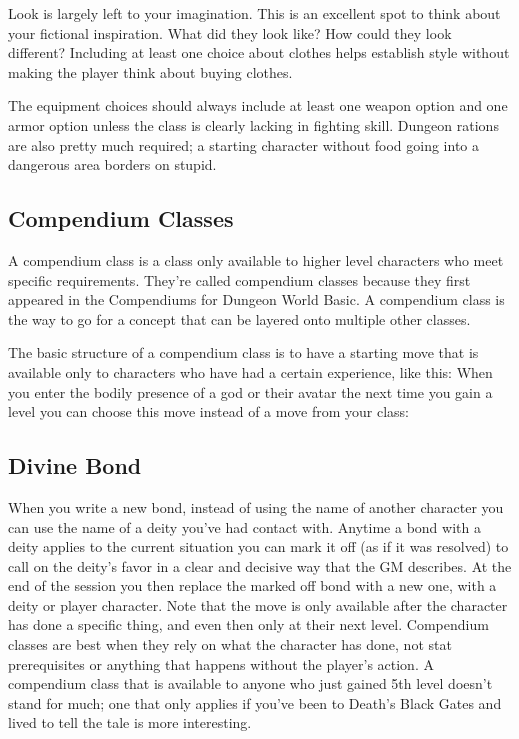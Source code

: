 Look is largely left to your imagination. This is an excellent spot to think about your fictional inspiration. What did they look like? How could they look different? Including at least one choice about clothes helps establish style without making the player think about buying clothes.


The equipment choices should always include at least one weapon option and one armor option unless the class is clearly lacking in fighting skill. Dungeon rations are also pretty much required; a starting character without food going into a dangerous area borders on stupid.
\subsection{Compendium Classes}


A compendium class is a class only available to higher level characters who meet specific requirements. They're called compendium classes because they first appeared in the Compendiums for Dungeon World Basic. A compendium class is the way to go for a concept that can be layered onto multiple other classes.


The basic structure of a compendium class is to have a starting move that is available only to characters who have had a certain experience, like this:
\newpage
\HRule
When you enter the bodily presence of a god or their avatar the next time you gain a level you can choose this move instead of a move from your class:
\subsection{Divine Bond}


When you write a new bond, instead of using the name of another character you can use the name of a deity you've had contact with. Anytime a bond with a deity applies to the current situation you can mark it off (as if it was resolved) to call on the deity's favor in a clear and decisive way that the GM describes. At the end of the session you then replace the marked off bond with a new one, with a deity or player character.
\HRule
Note that the move is only available after the character has done a specific thing, and even then only at their next level. Compendium classes are best when they rely on what the character has done, not stat prerequisites or anything that happens without the player's action. A compendium class that is available to anyone who just gained 5th level doesn't stand for much; one that only applies if you've been to Death's Black Gates and lived to tell the tale is more interesting.


